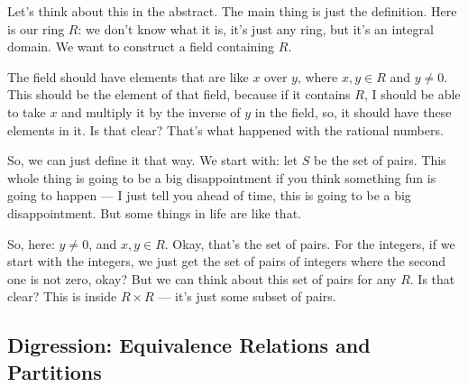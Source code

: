 \begin{speech}[00:36:16 - 00:38:05]
Let's think about this in the abstract. The main thing is just the definition. Here is our ring $R$: we don't know what it is, it's just any ring, but it's an integral domain.  We want to construct a field containing $R$. 

The field should have elements that are like $x$ over $y$, where $x, y \in R$ and $y \neq 0$.  This should be the element of that field, because if it contains $R$, I should be able to take $x$ and multiply it by the inverse of $y$ in the field, so, it should have these elements in it. Is that clear? That's what happened with the rational numbers.

So, we can just define it that way. We start with: let $S$ be the set of pairs.  This whole thing is going to be a big disappointment if you think something fun is going to happen --- I just tell you ahead of time, this is going to be a big disappointment. But some things in life are like that.

So, here: $y \neq 0$, and $x, y \in R$. Okay, that's the set of pairs. For the integers, if we start with the integers, we just get the set of pairs of integers where the second one is not zero, okay? But we can think about this set of pairs for any $R$. Is that clear? This is inside $R \times R$ --- it's just some subset of pairs.
\end{speech}

\subsection{Digression: Equivalence Relations and Partitions}

